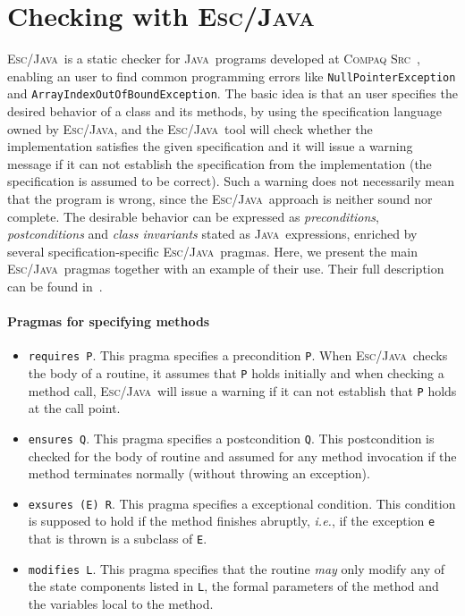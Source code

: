\documentclass[a4paper]{llncs}
\newcommand{\escj}{\textsc{Esc/Java}}
\newcommand{\java}{\textsc{Java}}
\newcommand{\csrc}{\textsc{Compaq Src}}
\begin{document}
\section{Checking with \escj}
\label{sec-esc-prg}

\escj~is a static checker for \java~programs developed
at \csrc~\cite{ESC}, enabling an user to find common programming errors like
\texttt{NullPointerException} and \texttt{ArrayIndexOutOfBoundException}. The basic idea is that
an user specifies the desired behavior of a class and its methods, by
using the specification language owned by \escj, and 
the \escj~tool will check whether the implementation satisfies the given
specification and it will issue a warning 
message if it can not establish the specification from the
implementation (the specification is assumed to be correct). Such a
warning does not necessarily mean that the program is
wrong, since the \escj~approach is neither sound nor complete. The
desirable behavior can be expressed as
\textit{preconditions}, \textit{postconditions} and \textit{class 
invariants} stated as \java~expressions, enriched by several
specification-specific \escj~pragmas. Here, we present
the main \escj~pragmas together with an example of their
use. Their full description can be found in~\cite{LeinoNS00}. 




\paragraph{\bf Pragmas for specifying methods} 
\begin{itemize} 
\item{\texttt{requires P}.} 
This pragma specifies a precondition {\tt P}. 
When \escj~checks the body of a
routine, it assumes that \texttt{P} holds initially and when checking
a method call, \escj~will issue a warning if 
it can not establish that \texttt{P} holds at the call point. 
 
\item{\texttt{ensures Q}.} 
This pragma specifies a postcondition \texttt{Q}. This postcondition
is checked for the body of routine and assumed for any method
invocation if the method terminates normally (without throwing an
exception).
 
\item{\texttt{exsures (E) R}.} 
This pragma specifies a exceptional condition. This condition is 
supposed to hold if the method finishes abruptly, \emph{i.e.}, if
the exception \texttt{e} that is thrown is a subclass of \texttt{E}. 
 
\item{\texttt{modifies L}.} 
This pragma specifies that the routine \emph{may} only modify any of 
the state components listed in \texttt{L}, the formal parameters of 
the method and the variables local to the method. 
\end{itemize}
 
\end{document}
